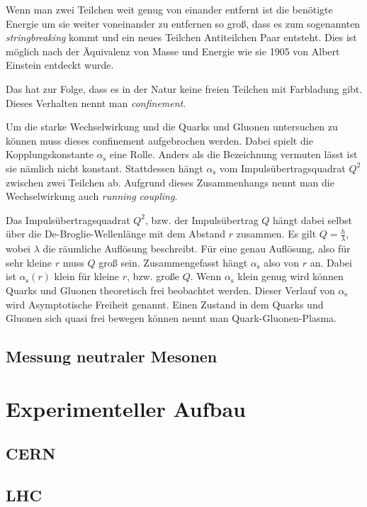 \documentclass[11pt]{article}
\begin{document}
Wenn man zwei Teilchen weit genug von einander entfernt ist die benötigte Energie um sie weiter voneinander zu entfernen so gro{\ss}, dass es zum sogenannten \textit{stringbreaking} kommt und ein neues Teilchen Antiteilchen Paar entsteht. Dies ist möglich nach der \"Aquivalenz von Masse und Energie wie sie 1905 von Albert Einstein entdeckt wurde.

Das hat zur Folge, dass es in der Natur keine freien Teilchen mit Farbladung gibt. Dieses Verhalten nennt man \textit{confinement}.

Um die starke Wechselwirkung und die Quarks und Gluonen untersuchen zu k\"onnen muss dieses confinement aufgebrochen werden. Dabei spielt die Kopplungskonstante $\alpha_\text{s}$ eine Rolle. Anders als die Bezeichnung vermuten l\"asst ist sie n\"amlich nicht konstant. Stattdessen h\"angt $\alpha_\text{s}$ vom Impulsübertragsquadrat $Q^{2}$ zwischen zwei Teilchen ab. Aufgrund dieses Zusammenhangs nennt man die Wechselwirkung auch \textit{running coupling}. 

Das Impulsübertragsquadrat $Q^{2}$, bzw. der Impulsübertrag $Q$ h\"angt dabei selbst \"uber die De-Broglie-Wellenl\"ange mit dem Abstand $r$ zusammen. Es gilt $Q = \frac{h}{\lambda}$, wobei $\lambda$ die r\"aumliche Aufl\"osung beschreibt. F\"ur eine genau Aufl\"osung, also f\"ur  sehr kleine $r$ muss $Q$ gro{\ss} sein.
Zusammengefasst h\"angt $\alpha_\text{s}$ also von $r$ an. Dabei ist $\alpha_\text{s}(r)$ klein f\"ur kleine $r$, bzw. gro{\ss}e $Q$.
Wenn $\alpha_\text{s}$ klein genug wird k\"onnen Quarks und Gluonen theoretisch frei beobachtet werden. Dieser Verlauf von $\alpha_\text{s}$ wird Asymptotische Freiheit genannt. Einen Zustand in dem Quarks und Gluonen sich quasi frei bewegen k\"onnen nennt man Quark-Gluonen-Plasma.

\subsection{Messung neutraler Mesonen}

\section{Experimenteller Aufbau}
\subsection{CERN}
\subsection{LHC}
\end{document}

